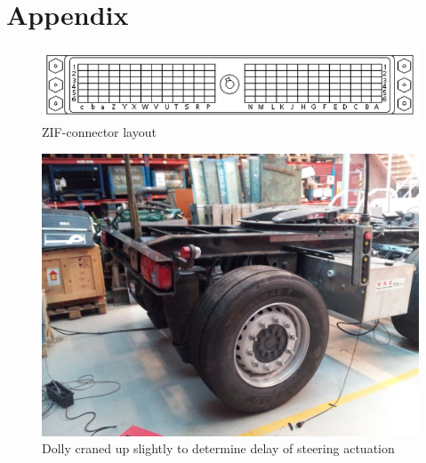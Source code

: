 \documentclass[ExampleMasters.tex]{subfiles}
\begin{document}
\clearpage
{\pagestyle{empty}\cleardoublepage}%

\appendix 
\chapter{Appendix}
\label{chap:Appendix}

\begin{figure}[h]
	\centering
	\includegraphics[width=1\linewidth]{figures/ZIF_connector}
	\caption[\acrshort{ZIF}-connector layout]{\acrshort{ZIF}-connector layout \cite{control_desk_help}}
	\label{fig:ZIF_connector}
\end{figure}


\begin{figure}[h]
\centering
\includegraphics[width=1\linewidth]{figures/dolly_craned_up}
\caption{Dolly craned up slightly to determine delay of steering actuation}
\label{fig:dolly_craned_up}
\end{figure}
\end{document}
